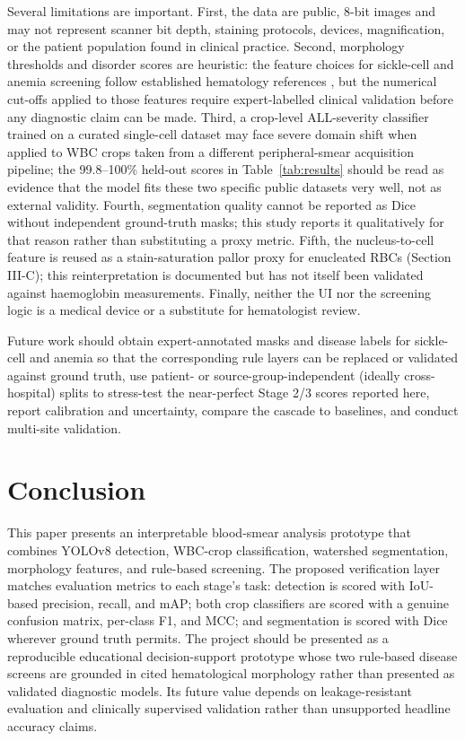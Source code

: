 \documentclass[conference]{IEEEtran}
\begin{document}
Several limitations are important. First, the data are public, 8-bit images and may not represent scanner bit depth, staining protocols, devices, magnification, or the patient population found in clinical practice. Second, morphology thresholds and disorder scores are heuristic: the feature choices for sickle-cell and anemia screening follow established hematology references \cite{ref_bain,ref_who,ref_xu}, but the numerical cut-offs applied to those features require expert-labelled clinical validation before any diagnostic claim can be made. Third, a crop-level ALL-severity classifier trained on a curated single-cell dataset may face severe domain shift when applied to WBC crops taken from a different peripheral-smear acquisition pipeline; the 99.8--100\% held-out scores in Table~\ref{tab:results} should be read as evidence that the model fits these two specific public datasets very well, not as external validity. Fourth, segmentation quality cannot be reported as Dice without independent ground-truth masks; this study reports it qualitatively for that reason rather than substituting a proxy metric. Fifth, the nucleus-to-cell feature is reused as a stain-saturation pallor proxy for enucleated RBCs (Section III-C); this reinterpretation is documented but has not itself been validated against haemoglobin measurements. Finally, neither the UI nor the screening logic is a medical device or a substitute for hematologist review.

Future work should obtain expert-annotated masks and disease labels for sickle-cell and anemia so that the corresponding rule layers can be replaced or validated against ground truth, use patient- or source-group-independent (ideally cross-hospital) splits to stress-test the near-perfect Stage 2/3 scores reported here, report calibration and uncertainty, compare the cascade to baselines, and conduct multi-site validation.

\section{Conclusion}

This paper presents an interpretable blood-smear analysis prototype that combines YOLOv8 detection, WBC-crop classification, watershed segmentation, morphology features, and rule-based screening. The proposed verification layer matches evaluation metrics to each stage's task: detection is scored with IoU-based precision, recall, and mAP; both crop classifiers are scored with a genuine confusion matrix, per-class F1, and MCC; and segmentation is scored with Dice wherever ground truth permits. The project should be presented as a reproducible educational decision-support prototype whose two rule-based disease screens are grounded in cited hematological morphology rather than presented as validated diagnostic models. Its future value depends on leakage-resistant evaluation and clinically supervised validation rather than unsupported headline accuracy claims.
\end{document}

